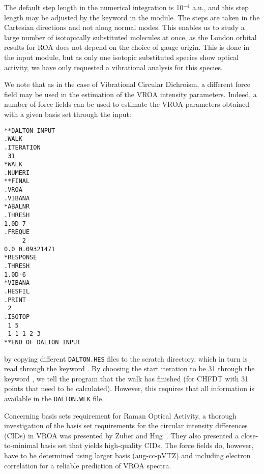The default step length in the numerical integration is 10$^{-4}$
a.u., and this step length may be adjusted by the keyword
 in the  module. The steps are taken in
the Cartesian directions and 
not along normal modes. This enables us to study a
large number of 
isotopically substituted molecules at
once, as the London orbital 
results for ROA does not depend on the choice of gauge origin. This is
done in the  input module, but as only one isotopic
substituted species show optical activity, we have only requested a
vibrational analysis for this species.

We note that as in the case of Vibrational Circular Dichroism, a different
force field may be used in the estimation of the VROA intensity
parameters. Indeed, a number of force fields can be used to estimate
the VROA parameters obtained with a given basis set through the input:

\begin{verbatim}
**DALTON INPUT
.WALK
.ITERATION
 31
*WALK
.NUMERI
**FINAL
.VROA
.VIBANA
*ABALNR
.THRESH
1.0D-7
.FREQUE
     2
0.0 0.09321471
*RESPONSE
.THRESH
1.0D-6
*VIBANA
.HESFIL
.PRINT
 2
.ISOTOP
 1 5
 1 1 1 2 3
**END OF DALTON INPUT
\end{verbatim}
by copying different \verb|DALTON.HES| files to the scratch
directory, which in turn is read through the keyword . By
choosing the start iteration to be 31 through the keyword
, we tell the program that the walk has finished (for
CHFDT with 31 points that need to be calculated). However, this
requires that all information is available in the \verb|DALTON.WLK|
file.

Concerning basis sets requirement for Raman Optical Activity, a
thorough investigation of the basis set requirements for the circular
intensity differences (CIDs) in VROA was presented by Zuber and
Hug~\cite{gzwhjpca108}. They also presented a close-to-minimal basis
set that yields high-quality CIDs. The force fields do, however, have
to be determined using larger basis (aug-cc-pVTZ) and including
electron correlation for a reliable prediction of VROA spectra.
